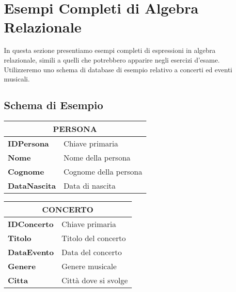\section{Esempi Completi di Algebra Relazionale}

In questa sezione presentiamo esempi completi di espressioni in algebra relazionale, simili a quelli che potrebbero apparire negli esercizi d'esame. Utilizzeremo uno schema di database di esempio relativo a concerti ed eventi musicali.

\subsection{Schema di Esempio}

\begin{table}[htbp]
	\centering
	\begin{tabular}{|l|l|}
		\hline
		\multicolumn{2}{|c|}{\textbf{PERSONA}} \\
		\hline
		\textbf{IDPersona} & Chiave primaria \\
		\textbf{Nome} & Nome della persona \\
		\textbf{Cognome} & Cognome della persona \\
		\textbf{DataNascita} & Data di nascita \\
		\hline
	\end{tabular}
	\hspace{1cm}
	\begin{tabular}{|l|l|}
		\hline
		\multicolumn{2}{|c|}{\textbf{CONCERTO}} \\
		\hline
		\textbf{IDConcerto} & Chiave primaria \\
		\textbf{Titolo} & Titolo del concerto \\
		\textbf{DataEvento} & Data del concerto \\
		\textbf{Genere} & Genere musicale \\
		\textbf{Citta} & Città dove si svolge \\
		\hline
	\end{tabular}
	
	\vspace{0.5cm}
	

\end{table}

